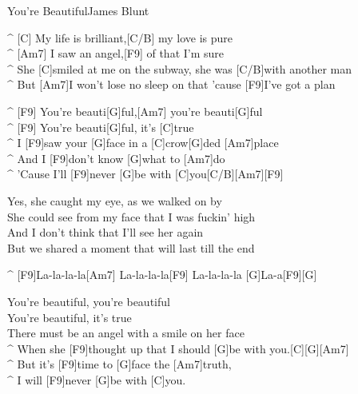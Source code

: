 \begin{song}{You're Beautiful}{James Blunt}

\begin{guitar}
^ [C] My life is brilliant,[C/B] my love is pure\\
^ [Am7] I saw an angel,[F9] of that I'm sure\\
^ She [C]smiled at me on the subway, she was [C/B]with another man\\
^ But [Am7]I won't lose no sleep on that 'cause [F9]I've got a plan\\
\end{guitar}

\begin{guitar}
^ [F9] You're beauti[G]ful,[Am7] you're beauti[G]ful\\
^ [F9] You're beauti[G]ful, it's [C]true\\
^ I [F9]saw your [G]face in a [C]crow[G]ded [Am7]place\\
^ And I [F9]don't know [G]what to [Am7]do\\
^ 'Cause I'll [F9]never [G]be with [C]you[C/B][Am7][F9]\\
\end{guitar}

\begin{guitar}
Yes, she caught my eye, as we walked on by\\
She could see from my face that I was fuckin' high\\
And I don't think that I'll see her again\\
But we shared a moment that will last till the end\\
\end{guitar}


\begin{guitar}
^ [F9]La-la-la-la[Am7] La-la-la-la[F9] La-la-la-la [G]La-a[F9][G]\\
\end{guitar}

\begin{guitar}
You're beautiful, you're beautiful\\
You're beautiful, it's true\\
There must be an angel with a smile on her face\\
^ When she [F9]thought up that I should [G]be with you.[C][G][Am7]\\
^ But it's [F9]time to [G]face the [Am7]truth,\\
^ I will [F9]never [G]be with [C]you.\\
\end{guitar}
\end{song}
